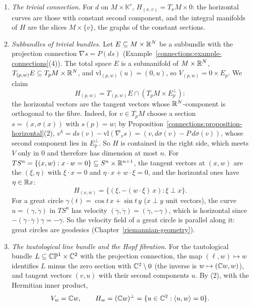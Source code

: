 \begin{example}\label{connections:example-horizontal}
\begin{enumerate}
\item \emph{The trivial connection.} For $d$ on $M \times \mathbb{K}^r$, $H_{(x, v)} = T_xM \times 0$: the horizontal curves are those with constant second component, and the integral
manifolds of $H$ are the slices $M \times \{v\}$, the graphs of the constant sections.
\item \emph{Subbundles of trivial bundles.} Let $E \subseteq M \times \mathbb{R}^N$ be a subbundle with the projection connection $\nabla s = P(ds)$ (Example~\ref{connections:example-connections}(4)).
The total space $E$ is a submanifold of $M \times \mathbb{R}^N$, $T_{(p, w)}E \subseteq T_pM \times \mathbb{R}^N$, and $\mathrm{vl}_{(p, w)}(u) = (0, u)$, so $V_{(p, w)} = 0 \times E_p$. We claim
\[
H_{(p, w)} = T_{(p, w)}E \cap (T_pM \times E_p^\perp):
\]
the horizontal vectors are the tangent vectors whose $\mathbb{R}^N$-component is orthogonal to the fibre. Indeed, for $v \in T_pM$ choose a section $s = (x, \sigma(x))$ with $s(p) = w$; by
Proposition~\ref{connections:proposition-horizontal}(2), $v^h = ds(v) - \mathrm{vl}(\nabla_vs) = (v, d\sigma(v) - P\,d\sigma(v))$, whose second component lies in $E_p^\perp$. So $H$ is
contained in the right side, which meets $V$ only in $0$ and therefore has dimension at most $n$. For $TS^n = \{(x, w) : x \cdot w = 0\} \subseteq S^n \times \mathbb{R}^{n+1}$, the tangent vectors
at $(x, w)$ are the $(\xi, \eta)$ with $\xi \cdot x = 0$ and $\eta \cdot x + w \cdot \xi = 0$, and the horizontal ones have $\eta \in \mathbb{R} x$:
\[
H_{(x, w)} = \{(\xi, -(w \cdot \xi)\,x) : \xi \perp x\}.
\]
For a great circle $\gamma(t) = \cos t\,x + \sin t\,y$ ($x \perp y$ unit vectors), the curve $u = (\gamma, \dot\gamma)$ in $TS^n$ has velocity $(\dot\gamma, \ddot\gamma) = (\dot\gamma, -\gamma)$,
which is horizontal since $-(\dot\gamma \cdot \dot\gamma)\gamma = -\gamma$. So the velocity field of a great circle is parallel along it: great circles are geodesics
(Chapter~\ref{riemannian-geometry}).
\item \emph{The tautological line bundle and the Hopf fibration.} For the tautological bundle $L \subseteq \mathbb{C}\mathbb{P}^1 \times \mathbb{C}^2$ with the projection connection, the map $(\ell, w) \mapsto w$
identifies $L$ minus the zero section with $\mathbb{C}^2 \setminus 0$ (the inverse is $w \mapsto (\mathbb{C} w, w)$), and tangent vectors $(v, u)$ with their second components $u$. By (2), with the
Hermitian inner product,
\[
V_w = \mathbb{C} w, \qquad H_w = (\mathbb{C} w)^\perp = \{u \in \mathbb{C}^2 : \langle u, w\rangle = 0\}.
\]
\end{enumerate}
\end{example}

